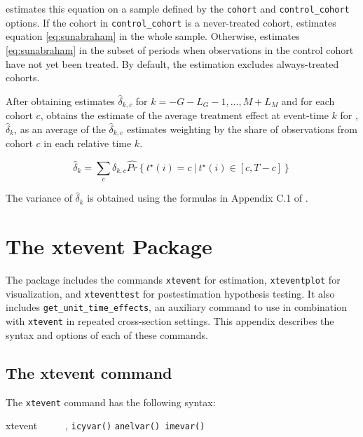 \documentclass[12pt]{article}
\begin{document}
\xtevent estimates this equation on a sample defined by the \texttt{cohort} and \texttt{control\_cohort} options.
If the cohort in \texttt{control\_cohort} is a never-treated cohort, \xtevent estimates equation \eqref{eq:sunabraham} in the whole sample.
Otherwise, \xtevent estimates \eqref{eq:sunabraham} in the subset of periods when observations in the control cohort have not yet been treated.
By default, the estimation excludes always-treated cohorts.

After obtaining estimates $\hat{\delta}_{k,c}$ for $k=-G-L_G-1,...,M+L_M$ and for each cohort $c$, \xtevent obtains the estimate of the average treatment effect at event-time $k$ for , $\hat{\delta}_k$, as an average of the $\hat{\delta}_{k,c}$ estimates weighting by the share of observations from cohort $c$ in each relative time $k$.

\begin{equation*}
  \hat{\delta}_k = \sum_c \delta_{k,c} \hat{Pr} \left\{ t^{\star}(i) = c \ | \ t^{\star}(i) \in [c,T-c] \right\}
\end{equation*}

The variance of $\hat{\delta}_k$ is obtained using the formulas in Appendix C.1 of \cite{sun2021estimating}.



\section{The xtevent Package}\label{sec:package}
The \xtevent package includes the commands \texttt{xtevent} for estimation, \texttt{xteventplot} for visualization, and \texttt{xteventtest} for postestimation hypothesis testing.
It also includes \texttt{get\_unit\_time\_effects}, an auxiliary command to use in combination with \texttt{xtevent} in repeated cross-section settings. This appendix describes the syntax and options of each of these commands.

\subsection{The xtevent command}
The \texttt{xtevent} command has the following syntax:

\begin{stsyntax}
	xtevent
	\depvar\
	\optindepvars\
	\optif\
	\optin\
	\optweight\
	\emph{,}
	\texttt{icyvar(\varname)}
	\texttt{anelvar(\varname)}\
	\texttt{imevar(\varname)}\
	
\end{stsyntax}
\end{document}
